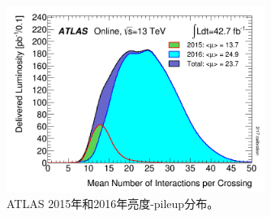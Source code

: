 \begin{figure}[h]
\centering
\includegraphics[width = 0.75\textwidth]{fig/mu_2015_2016.png}
\caption{ATLAS 2015年和2016年亮度-pileup分布。}
\label{fig:mu_2015_2016}
\end{figure}
